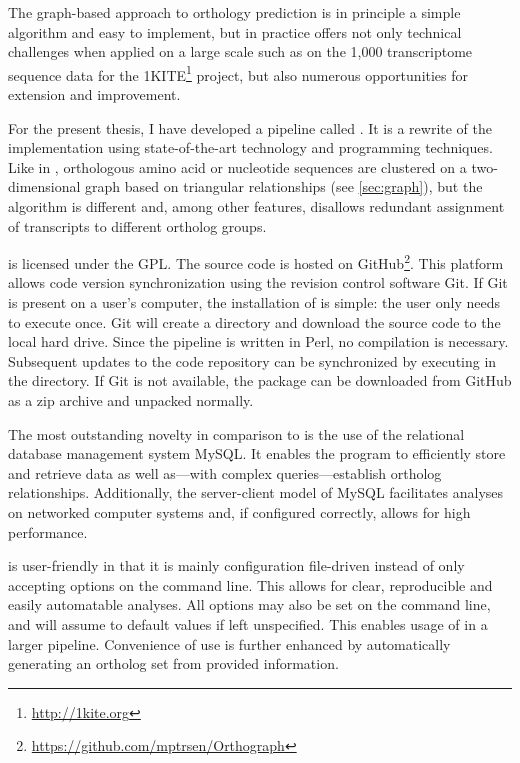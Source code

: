 The graph-based approach to orthology prediction is in principle a simple
algorithm and easy to implement, but in practice offers not only technical
challenges when applied on a large scale such as on the 1,000 transcriptome
sequence data for the 1KITE\footnote{\url{http://1kite.org}} project, but also
numerous opportunities for extension and improvement. 

For the present thesis, I have developed a pipeline called \pname.  It is a
rewrite of the \hamstr implementation using state-of-the-art technology and
programming techniques. Like in \hamstr, orthologous amino acid or nucleotide
sequences are clustered on a two-dimensional graph based on triangular
relationships (see \autoref{sec:graph}), but the algorithm is different and,
among other features, disallows redundant assignment of transcripts to different
ortholog groups.

\pname is licensed under the GPL. The source code is hosted on
GitHub\footnote{\url{https://github.com/mptrsen/Orthograph}}. This platform
allows code version synchronization using the revision control software Git. If
Git is present on a user's computer, the installation of \pname is simple: the
user only needs to execute  once. Git will create a directory and
download the source code to the local hard drive. Since the pipeline is written
in Perl, no compilation is necessary. Subsequent updates to the code repository
can be synchronized by executing  in the \pname directory. If Git
is not available, the package can be downloaded from GitHub as a zip archive and
unpacked normally.

The most outstanding novelty in comparison to \hamstr is the use of the
relational database management system MySQL. It enables the program to
efficiently store and retrieve data as well as---with complex 
queries---establish ortholog relationships. Additionally, the server-client
model of MySQL facilitates analyses on networked computer systems and, if
configured correctly, allows for high performance.

\pname is user-friendly in that it is mainly configuration file-driven instead
of only accepting options on the command line. This allows for clear,
reproducible and easily automatable analyses. All options may also be set on the
command line, and will assume to default values if left unspecified. This
enables usage of \pname in a larger pipeline. Convenience of use is further
enhanced by automatically generating an ortholog
set from provided information.

